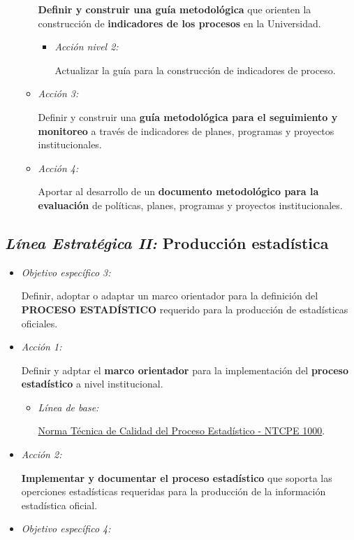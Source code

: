 \documentclass[
]{book}
\begin{document}
\begin{itemize}
\begin{itemize}
    \textbf{Definir y construir una guía metodológica} que orienten la construcción de \textbf{indicadores de los procesos} en la Universidad.

    \begin{itemize}
    \item
      \emph{Acción nivel 2:}

      Actualizar la guía para la construcción de indicadores de proceso.
    \end{itemize}
  \item
    \emph{Acción 3:}

    Definir y construir una \textbf{guía metodológica para el seguimiento y monitoreo} a través de indicadores de planes, programas y proyectos institucionales.
  \item
    \emph{Acción 4:}

    Aportar al desarrollo de un \textbf{documento metodológico para la evaluación} de políticas, planes, programas y proyectos institucionales.
  \end{itemize}
\end{itemize}

\hypertarget{luxednea-estratuxe9gica-ii-producciuxf3n-estaduxedstica}{%
\subsection{\texorpdfstring{\emph{Línea Estratégica II:} Producción estadística}{Línea Estratégica II: Producción estadística}}\label{luxednea-estratuxe9gica-ii-producciuxf3n-estaduxedstica}}

\begin{itemize}
\item
  \emph{Objetivo específico 3:}

  Definir, adoptar o adaptar un marco orientador para la definición del \textbf{PROCESO ESTADÍSTICO} requerido para la producción de estadísticas oficiales.
\item
  \emph{Acción 1:}

  Definir y adptar el \textbf{marco orientador} para la implementación del \textbf{proceso estadístico} a nivel institucional.

  \begin{itemize}
  \item
    \emph{Línea de base:}

    \href{https://www.dane.gov.co/files/sen/normatividad/NTC-Proceso-Estadistico-PE-1000-2020.pdf}{Norma Técnica de Calidad del Proceso Estadístico - NTCPE 1000}.
  \end{itemize}
\item
  \emph{Acción 2:}

  \textbf{Implementar y documentar el proceso estadístico} que soporta las operciones estadísticas requeridas para la producción de la información estadística oficial.
\item
  \emph{Objetivo específico 4:}
\end{itemize}
\end{document}
